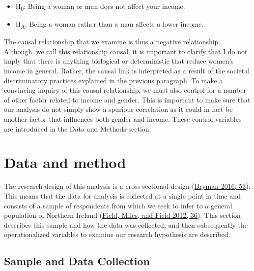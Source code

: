 \documentclass[
]{article}
\providecommand{\tightlist}{%
  \setlength{\itemsep}{0pt}\setlength{\parskip}{0pt}}
\begin{document}
\begin{itemize}
\tightlist
\item
  H\textsubscript{0}: Being a woman or man does not affect your income.
\item
  H\textsubscript{A}: Being a woman rather than a man affects a lower
  income.
\end{itemize}

The causal relationship that we examine is thus a negative relationship.
Although, we call this relationship causal, it is important to clarify
that I do not imply that there is anything biological or deterministic
that reduce women's income in general. Rather, the causal link is
interpreted as a result of the societal discriminatory practices
explained in the previous paragraph. To make a convincing inquiry of
this causal relationship, we must also control for a number of other
factor related to income and gender. This is important to make sure that
our analysis do not simply show a spurious correlation as it could in
fact be another factor that influences both gender and income. These
control variables are introduced in the Data and Methods-section.

\hypertarget{data-and-method}{%
\section{Data and method}\label{data-and-method}}

The research design of this analysis is a cross-sectional design
(\protect\hyperlink{ref-bryman2016social}{Bryman 2016, 53}). This means
that the data for analysis is collected at a single point in time and
consists of a sample of respondents from which we seek to infer to a
general population of Northern Ireland
(\protect\hyperlink{ref-field2012discovering}{Field, Miles, and Field
2012, 36}). This section describes this sample and how the data was
collected, and then subsequently the operationalized variables to
examine our research hypothesis are described.

\hypertarget{sample-and-data-collection}{%
\subsection{Sample and Data
Collection}\label{sample-and-data-collection}}
\end{document}
